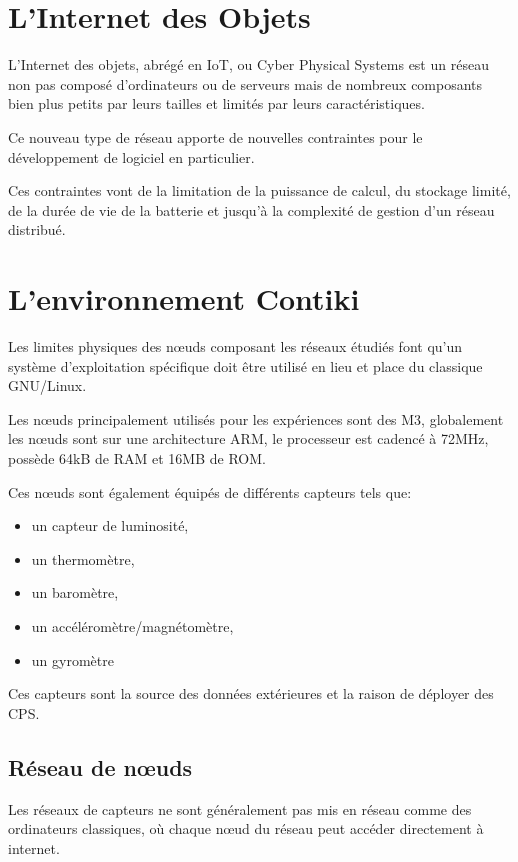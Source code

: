 \section{L'Internet des Objets}

L'Internet des objets, abrégé en IoT, ou Cyber Physical Systems est un réseau non pas composé d'ordinateurs ou de serveurs mais de nombreux composants bien plus petits par leurs tailles et limités par leurs caractéristiques.

Ce nouveau type de réseau apporte de nouvelles contraintes pour le développement de logiciel en particulier.

Ces contraintes vont de la limitation de la puissance de calcul, du stockage limité, de la durée de vie de la batterie et jusqu'à la complexité de gestion d'un réseau distribué.

\section{L'environnement Contiki}

Les limites physiques des nœuds composant les réseaux étudiés font qu'un système d'exploitation spécifique doit être utilisé en lieu et place du classique GNU/Linux.


Les nœuds principalement utilisés pour les expériences sont des M3, globalement les nœuds sont sur une architecture ARM, le processeur est cadencé à 72MHz, possède 64kB de RAM et 16MB de ROM.

Ces nœuds sont également équipés de différents capteurs tels que:
\begin{itemize}
\item un capteur de luminosité,
\item un thermomètre,
\item un baromètre,
\item un accéléromètre/magnétomètre,
\item un gyromètre
\end{itemize}

Ces capteurs sont la source des données extérieures et la raison de déployer des CPS.

\subsection{Réseau de nœuds}

Les réseaux de capteurs ne sont généralement pas mis en réseau comme des ordinateurs classiques, où chaque nœud du réseau peut accéder directement à internet.


